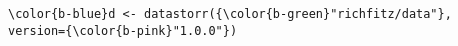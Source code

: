 \documentclass[class=minimal,border=0]{standalone}
\begin{document}
%
\begin{BVerbatim}[bgcolor=b-darkgrey]
\color{b-blue}d <- datastorr({\color{b-green}"richfitz/data"}, version={\color{b-pink}"1.0.0"})
\end{BVerbatim}
\end{document}
